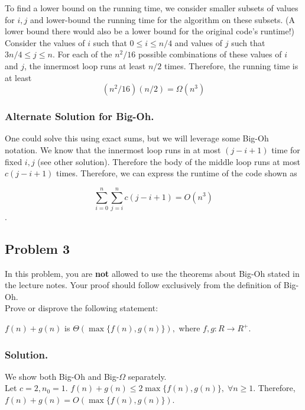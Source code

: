 To find a lower bound on the running time, we consider smaller subsets of values for $i,j$ and lower-bound the running time for the algorithm on these subsets. (A lower bound there would also be a lower bound for the original code's runtime!) Consider the values of $i$ such that $0 \leq i \leq n/4$ and values of $j$ such that $3n/4 \leq j \leq n$. For each of the $n^2/16$ possible combinations of these values of $i$ and $j$, the innermost loop runs at least $n/2$ times.
Therefore, the running time is at least $$(n^2/16)(n/2) = \Omega(n^3)$$


\subsubsection*{Alternate Solution for Big-Oh.}

One could solve this using exact sums, but we will leverage some Big-Oh notation. We know that the innermost loop runs in at most $(j-i+1)$ time for fixed $i,j$ (see other solution). Therefore the body of the middle loop runs at most $c(j-i+1)$ times. Therefore, we can express the runtime of the code shown as 

$$\sum_{i=0}^n \sum_{j=i}^n c(j-i+1) = O(n^3)$$.

\subsection*{Problem 3}
In this problem, you are \textbf{not} allowed to use the theorems about Big-Oh stated in the lecture notes. Your proof should follow exclusively from the definition of Big-Oh.\\

Prove or disprove the following statement:
\begin{center}
    $f(n) + g(n)$ is $\Theta(\max\big\{f(n),g(n)\big\}),$ where $f, g:R\rightarrow R^{+}$.
\end{center}

\subsubsection*{Solution.}

We show both Big-Oh and Big-$\Omega$ separately.\\

Let $c = 2, n_0 = 1$. $f(n) + g(n) \leq 2 \max\{f(n), g(n)\},\;\forall n \geq 1$. Therefore, $f(n) + g(n) = O(\max\{f(n), g(n)\})$.\\

